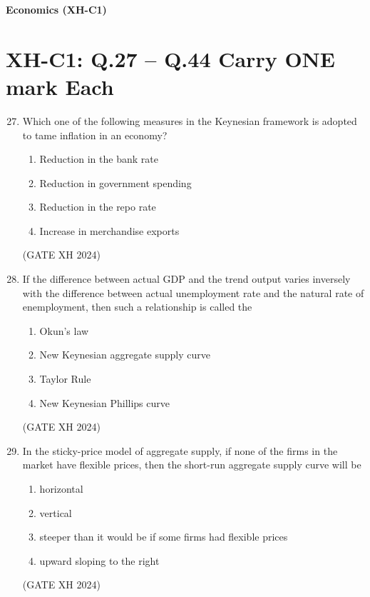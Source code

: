 \documentclass{article}
\begin{document}
\maketitle
\noindent \textbf{Economics (XH-C1)}
\section*{XH-C1: Q.27 – Q.44 Carry ONE mark Each}
\begin{enumerate}
\setcounter{enumi}{26}

    \item Which one of the following measures in the Keynesian framework is adopted to tame inflation in an economy?

    \begin{multicols}{2}
    \begin{enumerate}
        \item Reduction in the bank rate 
        \item Reduction in government spending
        \item Reduction in the repo rate
        \item Increase in merchandise exports
    \end{enumerate}
    \end{multicols} \hfill (GATE XH 2024)

    \item If the difference between actual GDP and the trend output varies inversely with the difference between actual unemployment rate and the natural rate of enemployment, then such a relationship is called the

    \begin{multicols}{2}
    \begin{enumerate}
        \item Okun’s law
        \item New Keynesian aggregate supply curve
        \item Taylor Rule
        \item New Keynesian Phillips curve
    \end{enumerate}
    \end{multicols} \hfill (GATE XH 2024)

    \item In the sticky-price model of aggregate supply, if none of the firms in the market have flexible prices, then the short-run aggregate supply curve will be
    
    \begin{enumerate}
        \item horizontal
        \item vertical 
        \item steeper than it would be if some firms had flexible prices
        \item upward sloping to the right
    \end{enumerate} \hfill (GATE XH 2024)


\end{enumerate}
\end{document}
